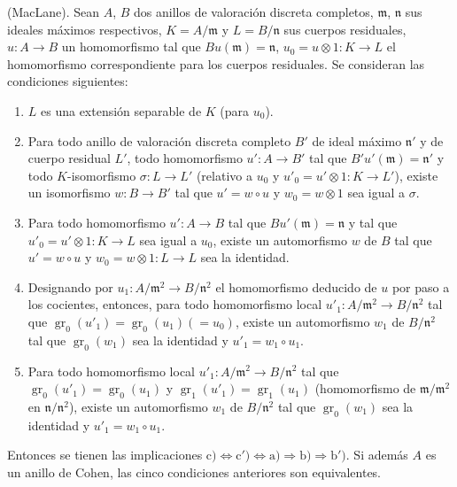 \begin{proposition}[21.5.2]
\label{0.21.5.2-fr}
\textnormal{(MacLane).}
Sean $A$, $B$ dos anillos de valoración discreta completos, $\mathfrak m$,
$\mathfrak n$ sus ideales máximos respectivos, $K=A/\mathfrak m$ y
$L=B/\mathfrak n$ sus cuerpos residuales, $u:A\to B$ un homomorfismo tal que
$Bu(\mathfrak m)=\mathfrak n$, $u_0=u\otimes 1:K\to L$ el homomorfismo
correspondiente para los cuerpos residuales. Se consideran las condiciones siguientes:
\begin{enumerate}
  \item[\rm a)] $L$ es una extensión separable de $K$ (para $u_0$).
  \item[\rm b)] Para todo anillo de valoración discreta completo $B'$ de ideal
  máximo $\mathfrak n'$ y de cuerpo residual $L'$,
  todo homomorfismo
  $u':A\to B'$ tal que $B'u'(\mathfrak m)=\mathfrak n'$ y todo
  $K$-isomorfismo $\sigma:L\to L'$ (relativo a $u_0$ y
  $u'_0=u'\otimes1:K\to L'$), existe un isomorfismo $w:B\to B'$ tal que
  $u'=w\circ u$ y $w_0=w\otimes1$ sea igual a $\sigma$.
  \item[\rm b$'$)] Para todo homomorfismo $u':A\to B$ tal que
  $Bu'(\mathfrak m)=\mathfrak n$ y tal que $u'_0=u'\otimes1:K\to L$ sea igual
  a $u_0$, existe un automorfismo $w$ de $B$ tal que $u'=w\circ u$ y
  $w_0=w\otimes1:L\to L$ sea la identidad.
  \item[\rm c)] Designando por $u_1:A/\mathfrak m^2\to B/\mathfrak n^2$
  el homomorfismo deducido de $u$ por paso a los cocientes, entonces, para todo
  homomorfismo local $u'_1:A/\mathfrak m^2\to B/\mathfrak n^2$ tal que
  $\operatorname{gr}_0(u'_1)=\operatorname{gr}_0(u_1)(=u_0)$, existe un
  automorfismo $w_1$ de $B/\mathfrak n^2$ tal que
  $\operatorname{gr}_0(w_1)$ sea la identidad y $u'_1=w_1\circ u_1$.
  \item[\rm c$'$)] Para todo homomorfismo local $u'_1:A/\mathfrak m^2\to
  B/\mathfrak n^2$ tal que $\operatorname{gr}_0(u'_1)=\operatorname{gr}_0(u_1)$
  y $\operatorname{gr}_1(u'_1)=\operatorname{gr}_1(u_1)$
  (homomorfismo de $\mathfrak m/\mathfrak m^2$ en
  $\mathfrak n/\mathfrak n^2$), existe un automorfismo $w_1$ de $B/\mathfrak n^2$
  tal que $\operatorname{gr}_0(w_1)$ sea la identidad y $u'_1=w_1\circ u_1$.
\end{enumerate}
Entonces se tienen las implicaciones $\mathrm{c})\Leftrightarrow\mathrm{c}')\Leftrightarrow\mathrm{a})\Rightarrow\mathrm{b})
 \Rightarrow\mathrm{b}')$. Si además $A$ es un anillo de Cohen, las cinco condiciones
anteriores son equivalentes.

\end{proposition}
